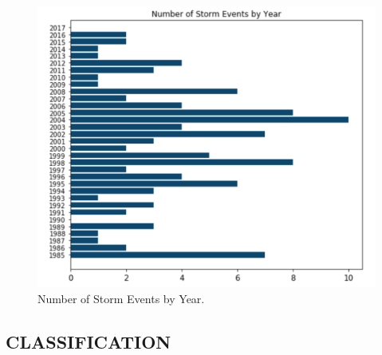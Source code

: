 \documentclass[letterpaper, 10 pt, conference]{ieeeconf}  %
\begin{document}
\begin{figure}[h!]
  \includegraphics[width=\linewidth]{year_freq.png}
  \caption{Number of Storm Events by Year.}
  \label{fig:storm_year}
\end{figure}

%

%

\subsection{CLASSIFICATION}
\end{document}
